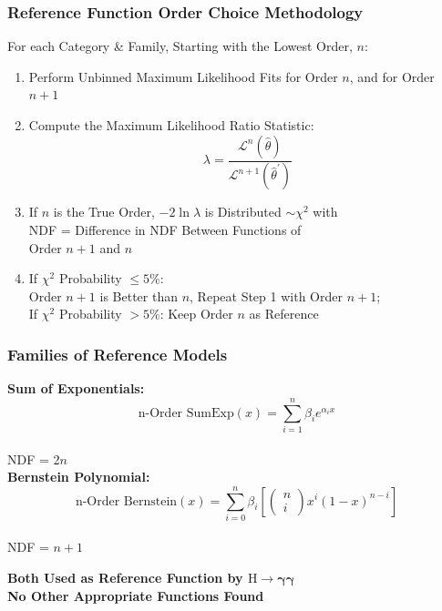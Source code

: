 \documentclass{beamer}
\newcommand{\hgamgam}{\ensuremath{\mathrm{H} \rightarrow \gamma\gamma}}
\begin{document}
\begin{frame}[label=refSelectionMethod]
\frametitle{Reference Function Order Choice Methodology}
  For each Category \& Family, Starting with the Lowest Order, $n$:
\small
  \begin{enumerate}
    \item Perform Unbinned Maximum Likelihood Fits for Order $n$, and for Order $n+1$
    \item Compute the Maximum Likelihood Ratio Statistic:
    \[ \lambda = \frac{\mathcal{L}^{n}(\hat{\theta})}{\mathcal{L}^{n+1}( \hat{\theta}^{'} )}\]
    \item If $n$ is the True Order, $-2\ln\lambda$ is Distributed $\sim \chi^2$ with \\ NDF = Difference in NDF Between Functions of \\ Order $n+1$ and $n$
    \item If $\chi^2$ Probability $\leq5\%$: 
        \\Order $n+1$ is Better than $n$, Repeat Step 1 with Order $n+1$;
        \\ If $\chi^2$ Probability $>5\%$: Keep Order $n$ as Reference
  \end{enumerate}
\end{frame}

\begin{frame}
\frametitle{Families of Reference Models}
\textbf{Sum of Exponentials:}
\\
\[ \mbox{n-Order SumExp}(x) = \sum^n_{i=1}\beta_i e^{\alpha_i x}\]
\\
\hspace{6.5em} NDF = 2$n$
\vspace{1ex}
\\
\textbf{Bernstein Polynomial:}
\[ 
\mbox{n-Order Bernstein}(x) = \sum^n_{i=0}\beta_i 
\left[
\left( \begin{array}{cc}
n \\ i
\end{array} \right)
x^i(1-x)^{n-i}
\right]
\]
\\
\hspace{6.5em} NDF = $n+1$
\\
\begin{center}
\textbf{
Both Used as Reference Function by $\bm{\hgamgam{}}$
\\
No Other Appropriate Functions Found
}
\end{center}

\end{frame}
\end{document}
